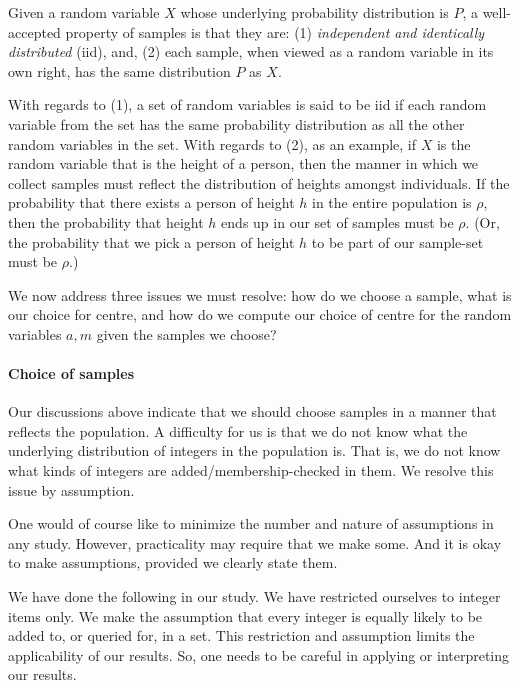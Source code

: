 Given a random variable $X$ whose underlying
probability distribution is $P$, a well-accepted property of
samples is that they are: (1) \emph{independent and identically
distributed} (iid), and, (2) each sample, when viewed as a
random variable
in its own right, has the same distribution $P$ as $X$.

With regards to (1),
a set of random variables is said to be iid if each random
variable from the set has the same probability distribution
as all the other random variables in the set.
With regards to (2), as an example,
if $X$ is the random variable that is the height
of a person, then the manner in which we collect samples must
reflect the distribution of heights amongst individuals.
If the probability that there exists a person of height $h$ in
the entire population is $\rho$, then the probability that height
$h$ ends up in our set of samples must be $\rho$.
(Or, the probability that we pick a person of height $h$ to be
part of our sample-set must be $\rho$.)

We now address three issues we must resolve: how do we choose
a sample, what is our choice for centre, and how do we compute
our choice of centre for the random variables $a,m$ given the
samples we choose?

\paragraph{Choice of samples} Our discussions above indicate that
we should choose samples in a manner that reflects the population.
A difficulty for us is that we do not know what the underlying
distribution of integers in the population is.
That is, we do not know what kinds of 
integers are added/membership-checked
in them. We resolve this issue by assumption.

One would of course like to minimize the number and nature of
assumptions in any study. However, practicality may require that
we make some. And it is okay to make assumptions, provided
we clearly state them.

We have done the following in our study.
We have restricted ourselves to integer items only.
We make the assumption that every integer is
equally likely to be added to, or queried for, in a set.
This restriction and assumption limits the applicability
of our results. So, one needs to be careful in applying or
interpreting our results.

